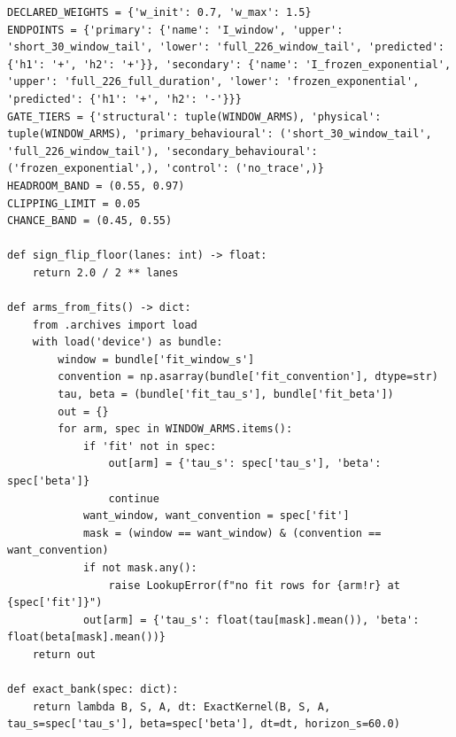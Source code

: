 \documentclass[a4paper,10pt]{article}
\begin{document}
\begin{Verbatim}
DECLARED_WEIGHTS = {'w_init': 0.7, 'w_max': 1.5}
ENDPOINTS = {'primary': {'name': 'I_window', 'upper': 'short_30_window_tail', 'lower': 'full_226_window_tail', 'predicted': {'h1': '+', 'h2': '+'}}, 'secondary': {'name': 'I_frozen_exponential', 'upper': 'full_226_full_duration', 'lower': 'frozen_exponential', 'predicted': {'h1': '+', 'h2': '-'}}}
GATE_TIERS = {'structural': tuple(WINDOW_ARMS), 'physical': tuple(WINDOW_ARMS), 'primary_behavioural': ('short_30_window_tail', 'full_226_window_tail'), 'secondary_behavioural': ('frozen_exponential',), 'control': ('no_trace',)}
HEADROOM_BAND = (0.55, 0.97)
CLIPPING_LIMIT = 0.05
CHANCE_BAND = (0.45, 0.55)

def sign_flip_floor(lanes: int) -> float:
    return 2.0 / 2 ** lanes

def arms_from_fits() -> dict:
    from .archives import load
    with load('device') as bundle:
        window = bundle['fit_window_s']
        convention = np.asarray(bundle['fit_convention'], dtype=str)
        tau, beta = (bundle['fit_tau_s'], bundle['fit_beta'])
        out = {}
        for arm, spec in WINDOW_ARMS.items():
            if 'fit' not in spec:
                out[arm] = {'tau_s': spec['tau_s'], 'beta': spec['beta']}
                continue
            want_window, want_convention = spec['fit']
            mask = (window == want_window) & (convention == want_convention)
            if not mask.any():
                raise LookupError(f"no fit rows for {arm!r} at {spec['fit']}")
            out[arm] = {'tau_s': float(tau[mask].mean()), 'beta': float(beta[mask].mean())}
    return out

def exact_bank(spec: dict):
    return lambda B, S, A, dt: ExactKernel(B, S, A, tau_s=spec['tau_s'], beta=spec['beta'], dt=dt, horizon_s=60.0)


\end{Verbatim}
\end{document}
